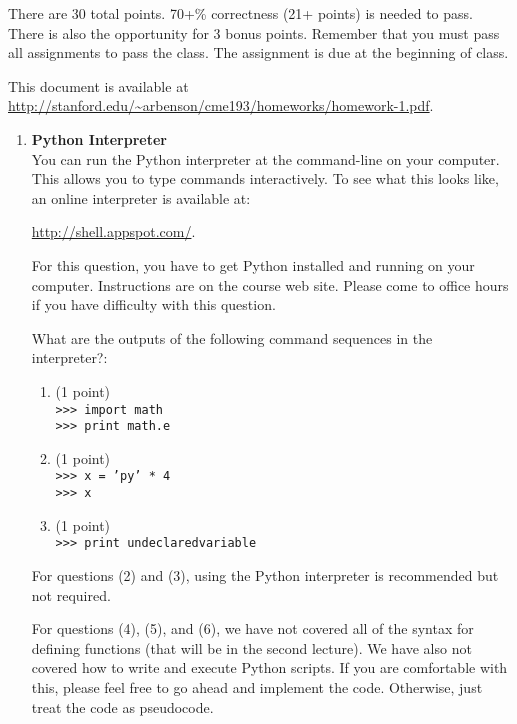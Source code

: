 \documentclass{article}
\newcounter{points}
\newcommand\setpoint{\addtocounter{points}{1}(1 point)}
\begin{document}
\pagestyle{fancy}

There are 30 total points.  70+\% correctness (21+ points) is needed to pass.  There is also the opportunity for 3 bonus points.  Remember that you must pass all assignments to pass the class.  The assignment is due at the beginning of class.

This document is available at \url{http://stanford.edu/~arbenson/cme193/homeworks/homework-1.pdf}.

\begin{enumerate}
\item \textbf{Python Interpreter} \\
You can run the Python interpreter at the command-line on your computer.  This allows you to type commands interactively.  To see what this looks like, an online interpreter is available at:
\begin{center}
\url{http://shell.appspot.com/}.
\end{center}
For this question, you have to get Python installed and running on your computer.  Instructions are on the course web site.  Please come to office hours if you have difficulty with this question.

What are the outputs of the following command sequences in the interpreter?:

\begin{enumerate}
\item \setpoint \\
\texttt{>>> import math} \\
\texttt{>>> print math.e}
\end{enumerate}

\begin{enumerate}
\setcounter{enumii}{1}
\item \setpoint \\
\texttt{>>> x = 'py' * 4} \\
\texttt{>>> x}
\end{enumerate}

\begin{enumerate}
\setcounter{enumii}{2}
\item \setpoint \\
\texttt{>>> print undeclaredvariable}
\end{enumerate}
For questions (2) and (3), using the Python interpreter is recommended but not required.

For questions (4), (5), and (6), we have not covered all of the syntax for defining functions (that will be in the second lecture).  We have also not covered how to write and execute Python scripts.  If you are comfortable with this, please feel free to go ahead and implement the code.  Otherwise, just treat the code as pseudocode.


\end{enumerate}
\end{document}
